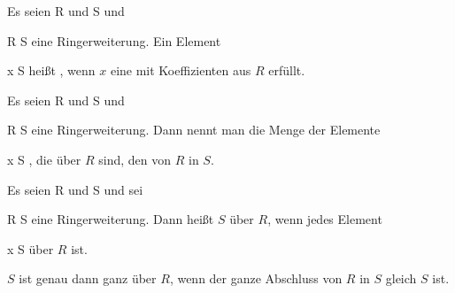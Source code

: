 {}
{





Es seien
\mathkor {} {R} {und} {S} {}
und

\mavergleichskette
{\vergleichskette
{R
}
{ \subseteq }{ S
}
{  }{
}
{    }{
}
{   }{
}
}
{}{}{}
eine Ring\-erweiterung. Ein Element

\mavergleichskette
{\vergleichskette
{ x
}
{ \in }{ S
}
{  }{
}
{    }{
}
{   }{
}
}
{}{}{}
heißt 
 {} {,}
wenn $x$ eine
mit Koeffizienten aus $R$ erfüllt.





}


{}
{





Es seien
\mathkor {} {R} {und} {S} {}
und

\mavergleichskette
{\vergleichskette
{R
}
{ \subseteq }{ S
}
{  }{
}
{    }{
}
{   }{
}
}
{}{}{}
eine Ring\-erweiterung. Dann nennt man die Menge der Elemente

\mavergleichskette
{\vergleichskette
{ x
}
{ \in }{ S
}
{  }{
}
{    }{
}
{   }{
}
}
{}{}{,}
die
über $R$ sind, den  von $R$ in $S$.





}


{}
{





Es seien
\mathkor {} {R} {und} {S} {}
und sei

\mavergleichskette
{\vergleichskette
{R
}
{ \subseteq }{ S
}
{  }{
}
{    }{
}
{   }{
}
}
{}{}{}
eine Ring\-erweiterung. Dann heißt $S$  über $R$, wenn jedes Element

\mavergleichskette
{\vergleichskette
{ x
}
{ \in }{ S
}
{  }{
}
{    }{
}
{   }{
}
}
{}{}{}
über $R$ ist.





}

$S$ ist genau dann ganz über $R$, wenn der ganze Abschluss von $R$ in $S$ gleich $S$ ist.





